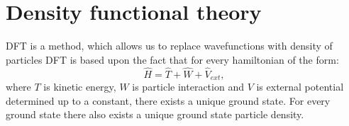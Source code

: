 \documentclass[openany, longbibliography,slovene,a4paper,12pt]{article}
\begin{document}
\section{Density functional theory}
DFT is a method, which allows us to replace wavefunctions with density of particles
DFT is based upon the fact that for every hamiltonian of the form:
\begin{equation}
\hat H = \hat T + \hat W + \hat V_{ext},
\end{equation}
where $T$ is kinetic energy, $W$ is particle interaction and $V$ is external potential determined up to a constant, there exists a unique ground state. For every ground state there also exists a unique ground state particle density. 
\end{document}
